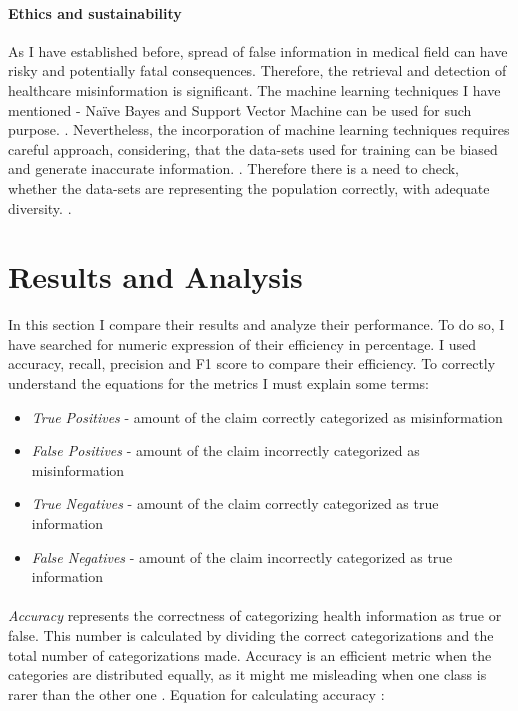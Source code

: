 \documentclass[11pt ,english,a4paper]{article}
\begin{document}
\paragraph{Ethics and sustainability}%
As I have established before, spread of false information in medical field can have risky and potentially fatal consequences. Therefore, the retrieval and detection of healthcare misinformation is significant. The machine learning techniques I have mentioned - Naïve Bayes and Support Vector Machine can be used for such purpose. \cite{chap22unmask}. Nevertheless, the incorporation of machine learning techniques requires careful approach, considering, that the data-sets used for training can be biased and generate inaccurate information. \cite{who21ethics}. Therefore there is a need to check, whether the data-sets are representing the population correctly, with adequate diversity. \cite{sch23aut}.

\section{Results and Analysis}\label{analysis}
In this section I compare their results and analyze their performance. To do so, I have searched for numeric expression of their efficiency in percentage. I used accuracy, recall, precision and F1 score to compare their efficiency. To correctly understand the equations for the metrics I must explain some terms:

\begin{itemize}[itemsep=-5pt]
\item \emph{True Positives} - amount of the claim correctly categorized as misinformation
\item \emph{False Positives} - amount of the claim incorrectly categorized as misinformation
\item \emph{True Negatives} - amount of the claim correctly categorized as true information
\item \emph{False Negatives} - amount of the claim incorrectly categorized as true information
\end{itemize}

\paragraph{} \emph{Accuracy} represents the correctness of categorizing health information as true or false. This number is calculated by dividing the correct categorizations and the total number of categorizations made. Accuracy is an efficient metric when the categories are distributed equally, as it might me misleading when one class is rarer than the other one \cite{aph18detect}. Equation for calculating accuracy \cite{sha20mach}:
\end{document}
